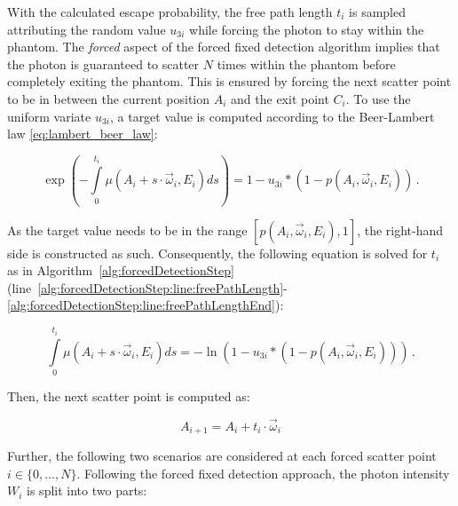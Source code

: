 With the calculated escape probability, the free path length $t_i$ is sampled
attributing the random value $u_{3i}$ while forcing the photon to stay within
the phantom. The \emph{forced} aspect of the forced fixed detection algorithm
implies that the photon is guaranteed to scatter $N$ times within the phantom
before completely exiting the phantom. This is ensured by forcing the next
scatter point to be in between the current position $A_i$ and the exit point
$C_i$. To use the uniform variate $u_{3i}$, a target value is computed
according to the Beer-Lambert law \eqref{eq:lambert_beer_law}:

\begin{equation*}
    \exp(-\int\limits_0^{t_i} \mu(A_{i} + s \cdot \vec{\omega}_{i}, E_{i}) ds) = 1 - u_{3i} * (1 - p(A_i, \vec{\omega}_i, E_i))\,.
\end{equation*}

As the target value needs to be in the range $[p(A_i, \vec{\omega}_i, E_i), 1]$,
the right-hand side is constructed as such. Consequently, the following equation
is solved for $t_i$ as in
Algorithm~\ref{alg:forcedDetectionStep} (line~\ref{alg:forcedDetectionStep:line:freePathLength}-\ref{alg:forcedDetectionStep:line:freePathLengthEnd}):

\begin{equation}
    \int\limits_0^{t_i} \mu(A_{i} + s \cdot \vec{\omega}_{i}, E_{i}) ds = 
    -\ln(1-u_{3i} * (1-p(A_i, \vec{\omega}_i, E_i)))\,.
    \label{eq:freePathLength}
\end{equation}

Then, the next scatter point is computed as:

\begin{equation*}
    A_{i+1} = A_i + t_i \cdot \vec{\omega}_i
\end{equation*}

Further, the following two scenarios are considered at each forced scatter
point $i \in \{0, \ldots, N\}$. Following the forced fixed detection approach, the photon intensity $W_i$ is split into two parts:

